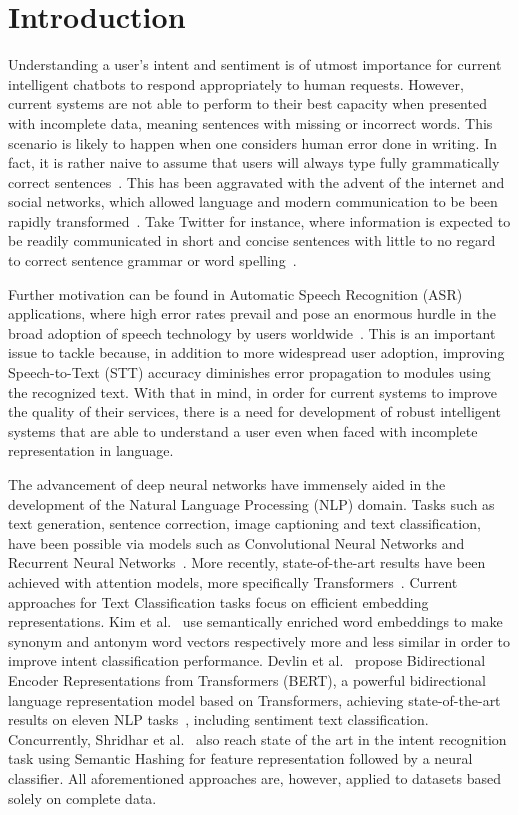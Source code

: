 \documentclass[review]{elsarticle}
\begin{document}
\section{Introduction}
\label{sec:intro}
Understanding a user's intent and sentiment is of utmost importance for current intelligent chatbots to respond appropriately to human requests. However, current systems are not able to perform to their best capacity when presented with incomplete data, meaning sentences with missing or incorrect words. This scenario is likely to happen when one considers human error done in writing. In fact, it is rather naive to assume that users will always type fully grammatically correct sentences~\cite{panko2008thinking}. This has been aggravated with the advent of the internet and social networks, which allowed language and modern communication to be been rapidly transformed~\cite{al2018evolution,grieve2018mapping}. Take Twitter for instance, where information is expected to be readily communicated in short and concise sentences with little to no regard to correct sentence grammar or word spelling~\cite{sirucek2010twitter}.

Further motivation can be found in Automatic Speech Recognition (ASR) applications, where high error rates prevail and pose an enormous hurdle in the broad adoption of speech technology by users worldwide~\cite{errattahi2018automatic}. This is an important issue to tackle because, in addition to more widespread user adoption, improving Speech-to-Text (STT) accuracy diminishes error propagation to modules using the recognized text. With that in mind, in order for current systems to improve the quality of their services, there is a need for development of robust intelligent systems that are able to understand a user even when faced with incomplete representation in language. 

The advancement of deep neural networks have immensely aided in the development of the Natural Language Processing (NLP) domain. Tasks such as text generation, sentence correction, image captioning and text classification, have been possible via models such as Convolutional Neural Networks and Recurrent Neural Networks~\cite{sergio2018temporal,vinyals2015show,kim2014convolutional}. More recently, state-of-the-art results have been achieved with attention models, more specifically Transformers~\cite{vaswani2017attention}. Current approaches for Text Classification tasks focus on efficient embedding representations. Kim et al.~\cite{kim2016intent} use semantically enriched word embeddings to make synonym and antonym word vectors respectively more and less similar in order to improve intent classification performance. Devlin et al.~\cite{devlin2018bert} propose Bidirectional Encoder Representations from Transformers (BERT), a powerful bidirectional language representation model based on Transformers, achieving state-of-the-art results on eleven NLP tasks~\cite{wang2018glue}, including sentiment text classification. Concurrently, Shridhar et al.~\cite{shridhar2018subword} also reach state of the art in the intent recognition task using Semantic Hashing for feature representation followed by a neural classifier. All aforementioned approaches are, however, applied to datasets based solely on complete data.
\end{document}
